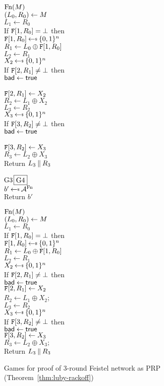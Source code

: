 \begin{figure}[p]
{\underline{$\textnormal{Fn}(M)$}\\
$(L_0, R_0) \gets M$\\
$L_1 \gets R_0$\\
If $\mathtt{F}[1,R_0] = \bot$ then\\
\ind $\TabF[1,R_0] \getsr \bits^n$\\
$R_1 \gets L_0 \oplus \mathtt{F}[1,R_0]$\\
$L_2 \gets R_1$\\
$X_2 \getsr \bits^n$\\
If $\mathtt{F}[2,R_1] \ne \bot$ then\\
\ind $\mathsf{bad}\gets\mathsf{true}$\\
\ind {}\\
$\mathtt{F}[2,R_1] \gets X_2$\\
$R_2 \gets L_1 \oplus X_2$\\
$L_3 \gets R_2$\\
$X_3 \getsr \bits^n$\\
If $\mathtt{F}[3,R_2] \ne \bot$ then\\
\ind $\mathsf{bad}\gets\mathsf{true}$\\
\ind {}\\
$\mathtt{F}[3,R_2] \gets X_3$\\
$R_3 \gets L_2 \oplus X_3$\\
Return $L_3 \: \| \: R_3$
}{
\underline{${{\textnormal G}}3$\;\;\;$\fbox{{{\textnormal G}}4}$}\\[2pt]
$b' \getsr \advA^\Fn$\\
Return $b'$\medskip

\underline{$\textnormal{Fn}(M)$}\\
$(L_0, R_0) \gets M$\\
$L_1 \gets R_0$\\
If $\mathtt{F}[1,R_0] = \bot$ then\\
\ind $\TabF[1,R_0] \getsr \bits^n$\\
$R_1 \gets L_0 \oplus \mathtt{F}[1,R_0]$\\
$L_2 \gets R_1$\\
$X_2 \getsr \bits^n$\\
If $\mathtt{F}[2,R_1] \ne \bot$ then\\
\ind $\mathsf{bad}\gets\mathsf{true}$\\
$\mathtt{F}[2,R_1] \gets X_2$\\
$R_2 \gets L_1 \oplus X_2$;\;\;\\
$L_3 \gets R_2$\\
$X_3 \getsr \bits^n$\\
If $\mathtt{F}[3,R_2] \ne \bot$ then\\
\ind $\mathsf{bad}\gets\mathsf{true}$\\
$\mathtt{F}[3,R_2] \gets X_3$\\
$R_3 \gets L_2 \oplus X_3;$\;\;\\
Return $L_3 \: \| \: R_3$
}
\caption{Games for proof of 3-round Feistel network as PRP (Theorem~\ref{thm:luby-rackoff})}
\label{fig:games-luby-rackoff}
\end{figure}

